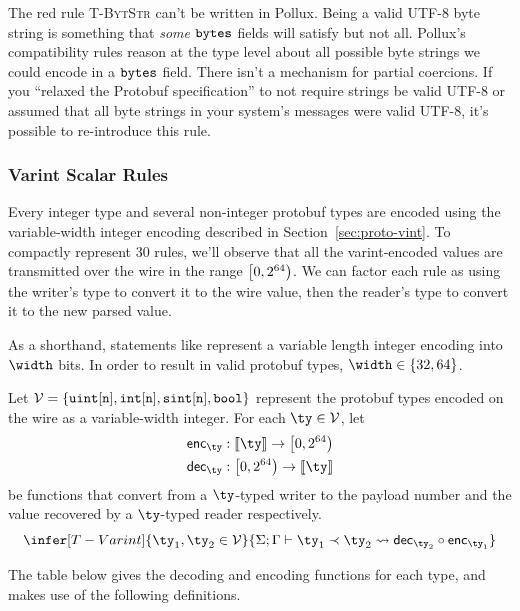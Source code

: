 The red rule \textsc{T-BytStr} can't be written in Pollux. Being a valid UTF-8
byte string is something that \emph{some} $\texttt{bytes}$ fields will satisfy but not
all. Pollux's compatibility rules reason at the type level about all possible
byte strings we could encode in a $\texttt{bytes}$ field. There isn't a mechanism for
partial coercions. If you ``relaxed the Protobuf specification'' to not require
strings be valid UTF-8 or assumed that all byte strings in your system's
messages were valid UTF-8, it's possible to re-introduce this rule.

\subsubsection{Varint Scalar Rules}\label{sec:proto-compat-ints}

Every integer type and several non-integer protobuf types are encoded using the
variable-width integer encoding described in Section~\ref{sec:proto-vint}. To
compactly represent 30 rules, we'll observe that all the varint-encoded values
are transmitted over the wire in the range $\left[0, 2^{64}\right)$. We can factor each
rule as using the writer's type to convert it to the wire value, then the
reader's type to convert it to the new parsed value.

As a shorthand, statements like  represent a variable length integer
encoding into $\width$ bits. In order to result in valid protobuf types,
$\width \in \{32, 64\}$.

Let $\mathcal{V} = \left\{ \texttt{uint}[\texttt{n}], \texttt{int}[\texttt{n}], \texttt{sint}[\texttt{n}], \texttt{bool} \right\}$ represent
the protobuf types encoded on the wire as a variable-width integer. For each
$\ty \in \vints$, let
\begin{align*}
  \encop{\ty} &: \denote{\ty} \rightarrow \payload \\
  \decop{\ty} &: \payload \rightarrow \denote{\ty}
\end{align*}
be functions that convert from a $\ty$-typed writer to the payload number and
the value recovered by a $\ty$-typed reader respectively.
\[
  \infer[T-Varint]{ \ty_1, \ty_2 \in \vints}{\judg{\Gamma}{\ty_1 \typrel \ty_2 \coerce
      \decop{\ty_2} \circ \encop{\ty_1}}}
\]

The table below gives the decoding and encoding functions for each type, and
makes use of the following definitions.

